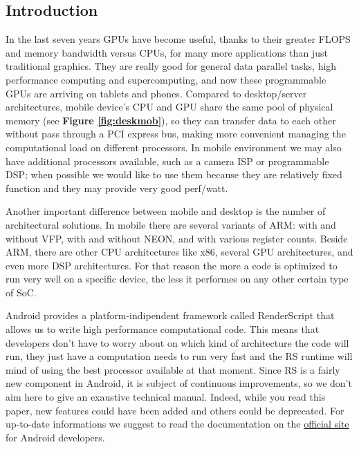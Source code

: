 \documentclass[a4paper,10pt]{article}
\begin{document}
\vspace{4ex}	%
\begin{multicols}{2}

\section{Introduction}
In the last seven years GPUs have become useful, thanks to their greater FLOPS and memory bandwidth versus CPUs, for many more applications than just traditional graphics. They are really good for general data parallel tasks, high performance computing and supercomputing, and
now these programmable GPUs are arriving on tablets and phones.
Compared to desktop/server architectures, mobile device's CPU and GPU share the same pool of physical memory (see {\bf Figure \ref{fig:deskmob}}), so they can transfer data to each other without pass through a PCI express bus, making more convenient managing the computational load on different processors.
In mobile environment we may also have additional processors available, such as a camera ISP or programmable DSP; when possible we would like to use them because they are relatively fixed function and they may provide very good perf/watt.

Another important difference between mobile and desktop is the number of architectural solutions. In mobile there are several variants of ARM: with and without VFP, with and without NEON, and with various register counts. Beside ARM, there are other CPU architectures like x86, several GPU architectures, and even more DSP architectures.
For that reason the more a code is optimized to run very well on a specific device, the less it performes on any other certain type of SoC.

Android provides a platform-indipendent framework called RenderScript that allows us to write high performance computational code. This means that developers don't have to worry about on which kind of architecture the code will run, they just have a computation needs to run very fast and the RS runtime will mind of using the best processor available at that moment.
Since RS is a fairly new component in Android, it is subject of continuous improvements, so we don't aim here to give an exaustive technical manual. Indeed, while you read this paper, new features could have been added and others could be deprecated. For up-to-date informations we suggest to read the documentation on the \href{http://developer.android.com/index.html}{official site} for Android developers.


\end{multicols}
\end{document}
